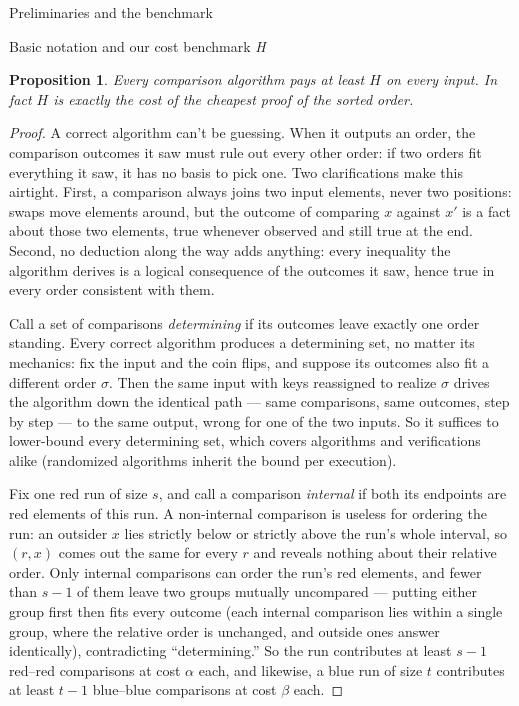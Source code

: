 \documentclass[11pt]{article}
\newtheorem{prop}[thm]{Proposition}
\theoremstyle{definition}
\numberwithin{equation}{section}
\begin{document}
\begin{section}{Preliminaries and the benchmark}
\begin{subsection}{Basic notation and our cost benchmark {\em H}}
\begin{aiblock}
\begin{prop}\label{prop:Hlower}
Every comparison algorithm pays at least $H$ on every input. In fact
$H$ is exactly the cost of the cheapest proof of the sorted order.
\end{prop}
\begin{proof}
A correct algorithm can't be guessing. When it outputs an order,
the comparison outcomes it saw must rule out every other order: if
two orders fit everything it saw, it has no basis to pick one.
Two clarifications make this airtight. First, a comparison always
joins two input elements, never two positions: swaps move elements
around, but the outcome of comparing $x$ against $x'$ is a fact
about those two elements, true whenever observed and still true at
the end. Second, no deduction along the way adds anything: every
inequality the algorithm derives is a logical consequence of the
outcomes it saw, hence true in every order consistent with them.

Call a set of comparisons {\em determining} if its outcomes leave
exactly one order standing. Every correct algorithm produces a
determining set, no matter its mechanics: fix the input and the
coin flips, and suppose its outcomes also fit a different order
$\sigma$. Then the same input with keys reassigned to realize
$\sigma$ drives the algorithm down the identical path --- same
comparisons, same outcomes, step by step --- to the same output,
wrong for one of the two inputs. So it suffices to lower-bound
every determining set, which covers algorithms and verifications
alike (randomized algorithms inherit the bound per execution).

Fix one red run of size $s$, and call a comparison {\em internal}
if both its endpoints are red elements of this run. A non-internal
comparison is useless for ordering the run: an outsider $x$ lies
strictly below or strictly above the run's whole interval, so
$(r,x)$ comes out the same for every $r$ and reveals nothing about
their relative order. Only internal comparisons can order the
run's red elements, and fewer than $s-1$ of them leave two groups mutually
uncompared --- putting either group first then fits every outcome
(each internal comparison lies within a single group, where the
relative order is unchanged, and outside ones answer identically),
contradicting ``determining.'' So the run contributes at least
$s-1$ red--red comparisons at cost $\alpha$ each, and likewise, a blue run of size $t$ contributes at least $t-1$ blue--blue comparisons at cost $\beta$ each.


\end{proof}
\end{aiblock}
\end{subsection}
\end{section}
\end{document}
